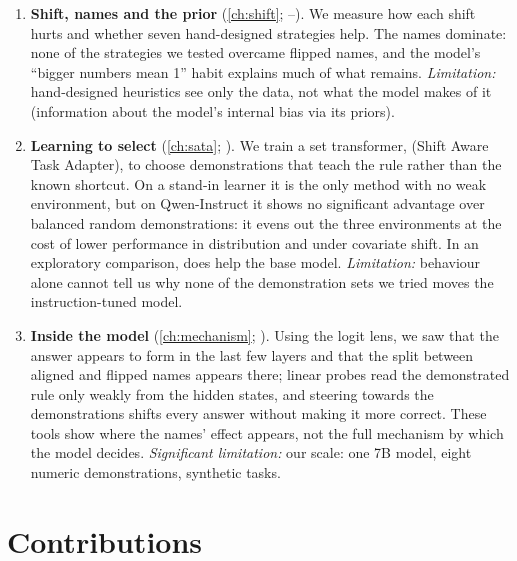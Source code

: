 \begin{enumerate}[leftmargin=2em]
  \item \textbf{Shift, names and the prior} (\autoref{ch:shift}; --).
        We measure how each shift hurts and whether seven hand-designed strategies help.
        The names dominate: none of the strategies we tested overcame flipped names, and the model's ``bigger numbers mean 1'' habit explains much of what remains.
        \emph{Limitation:} hand-designed heuristics see only the data, not what the model makes of it (information about the model's internal bias via its priors).
  \item \textbf{Learning to select} (\autoref{ch:sata}; ).
        We train a set transformer, \sata (Shift Aware Task Adapter), to choose demonstrations that teach the rule rather than the known shortcut.
        On a stand-in learner it is the only method with no weak environment, but on Qwen-Instruct it shows no significant advantage over balanced random demonstrations: it evens out the three environments at the cost of lower performance in distribution and under covariate shift. In an exploratory comparison, \sata does help the base model.
        \emph{Limitation:} behaviour alone cannot tell us why none of the demonstration sets we tried moves the instruction-tuned model.

  \item \textbf{Inside the model} (\autoref{ch:mechanism}; ).
        Using the logit lens, we saw that the answer appears to form in the last few layers and that the split between aligned and flipped names appears there; linear probes read the demonstrated rule only weakly from the hidden states, and steering towards the demonstrations shifts every answer without making it more correct. These tools show where the names' effect appears, not the full mechanism by which the model decides.
        \emph{Significant limitation:} our scale: one 7B model, eight numeric demonstrations, synthetic tasks.
\end{enumerate}

\section{Contributions}

